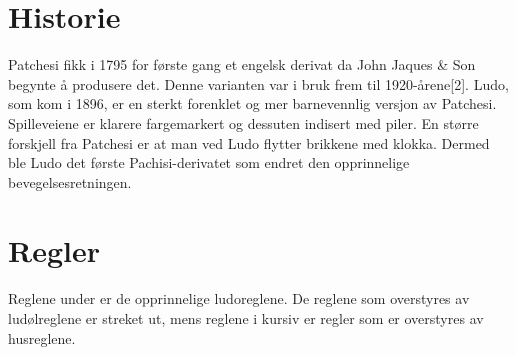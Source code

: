 \documentclass[10pt,a4paper,norsk,openany]{book}
\begin{document}
\section{Historie}

Patchesi fikk i 1795 for første gang et engelsk derivat da John Jaques \& Son
begynte å produsere det. Denne varianten var i bruk frem til 1920-årene[2].
Ludo, som kom i 1896, er en sterkt forenklet og mer barnevennlig versjon av
Patchesi. Spilleveiene er klarere fargemarkert og dessuten indisert med piler.
En større forskjell fra Patchesi er at man ved Ludo flytter brikkene med klokka.
Dermed ble Ludo det første Pachisi-derivatet som endret den opprinnelige
bevegelsesretningen.

\section{Regler} Reglene under er de opprinnelige ludoreglene. De reglene
som overstyres av ludølreglene er streket ut, mens reglene i kursiv er regler
som er overstyres av husreglene.
\end{document}
